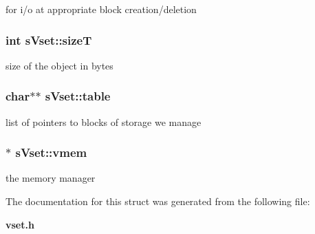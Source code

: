 for i/o at appropriate block creation/deletion 

\subsubsection[{size\+T}]{\setlength{\rightskip}{0pt plus 5cm}int s\+Vset\+::size\+T}\label{a00006_ab82de1c9f9c98179619094b92ffb4052}


size of the object in bytes 

\subsubsection[{table}]{\setlength{\rightskip}{0pt plus 5cm}char$\ast$$\ast$ s\+Vset\+::table}\label{a00006_a644cf781925192d072fa752cf2d08e13}


list of pointers to blocks of storage we manage 

\subsubsection[{vmem}]{$\ast$ s\+Vset\+::vmem}\label{a00006_a8af7fe493b077ad70164626b317e5d39}


the memory manager 



The documentation for this struct was generated from the following file\+:\begin{DoxyCompactItemize}
\item 
{\bf vset.\+h}\end{DoxyCompactItemize}
